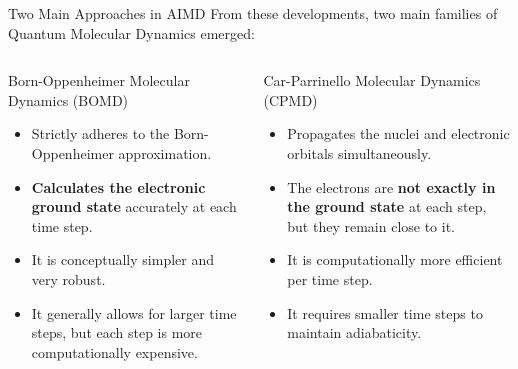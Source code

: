 \begin{frame}{Two Main Approaches in AIMD}
    From these developments, two main families of Quantum Molecular Dynamics emerged:
    \pause
    
    \begin{columns}
        \begin{column}{0.5\textwidth}
            \begin{block}{Born-Oppenheimer Molecular Dynamics (BOMD)}
                \begin{itemize}
                    \item Strictly adheres to the Born-Oppenheimer approximation.
                    \item \textbf{Calculates the electronic ground state} accurately at each time step.
                    \item It is conceptually simpler and very robust.
                    \item It generally allows for larger time steps, but each step is more computationally expensive.
                \end{itemize}
            \end{block}
        \end{column}
        \begin{column}{0.5\textwidth}
            \begin{block}{Car-Parrinello Molecular Dynamics (CPMD)}
                 \begin{itemize}
                    \item Propagates the nuclei and electronic orbitals simultaneously.
                    \item The electrons are \textbf{not exactly in the ground state} at each step, but they remain close to it.
                    \item It is computationally more efficient per time step.
                    \item It requires smaller time steps to maintain adiabaticity.
                \end{itemize}
            \end{block}
        \end{column}
    \end{columns}
\end{frame}


